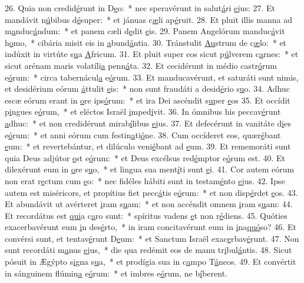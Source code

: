 26. Quia non credid\uline{é}runt in D\uline{e}o:~* nec speravérunt in salut\uline{á}ri \uline{e}jus:
27. Et mandávit n\uline{ú}bibus d\uline{é}super:~* et jánuas c\uline{æ}li ap\uline{é}ruit.
28. Et pluit illis manna ad m\uline{a}nduc\uline{á}ndum:~* et panem cæli d\uline{e}dit \uline{e}is.
29. Panem Angelórum manduc\uline{á}vit h\uline{o}mo,~* cibária misit eis in \uline{a}bund\uline{á}ntia.
30. Tránstulit \uline{Au}strum de c\uline{æ}lo:~* et indúxit in virtúte s\uline{u}a \uline{A}fricum.
31. Et pluit super eos sicut p\uline{ú}lverem c\uline{a}rnes:~* et sicut arénam maris volatíli\uline{a} penn\uline{á}ta.
32. Et cecidérunt in médio castr\uline{ó}rum e\uline{ó}rum:~* circa tabernácul\uline{a} e\uline{ó}rum.
33. Et manducavérunt, et saturáti sunt nimis, et desidérium eórum \uline{á}ttulit \uline{e}is:~* non sunt fraudáti a desid\uline{é}rio s\uline{u}o.
34. Adhuc escæ eórum erant in \uline{o}re ips\uline{ó}rum:~* et ira Dei ascéndit s\uline{u}per \uline{e}os
35. Et occídit p\uline{i}ngues e\uline{ó}rum,~* et eléctos Israël \uline{i}mped\uline{í}vit.
36. In ómnibus his peccav\uline{é}runt \uline{a}dhuc:~* et non credidérunt mirab\uline{í}libus \uline{e}jus.
37. Et defecérunt in vanitáte d\uline{i}es e\uline{ó}rum:~* et anni eórum cum festin\uline{a}ti\uline{ó}ne.
38. Cum occíderet eos, quær\uline{é}bant \uline{e}um:~* et revertebántur, et dilúculo veni\uline{é}bant ad \uline{e}um.
39. Et rememoráti sunt quia Deus adjútor \uline{e}st e\uline{ó}rum:~* et Deus excélsus red\uline{é}mptor e\uline{ó}rum est.
40. Et dilexérunt eum in \uline{o}re s\uline{u}o,~* et lingua sua ment\uline{í}ti sunt \uline{e}i.
41. Cor autem eórum non erat r\uline{e}ctum cum \uline{e}o:~* nec fidéles hábiti sunt in testam\uline{é}nto \uline{e}jus.
42. Ipse autem est miséricors, et propítius fiet pecc\uline{á}tis e\uline{ó}rum:~* et non disp\uline{é}rdet \uline{e}os.
43. Et abundávit ut avérteret \uline{i}ram s\uline{u}am:~* et non accéndit omnem \uline{i}ram s\uline{u}am:
44. Et recordátus est \uline{qui}a c\uline{a}ro sunt:~* spíritus vadens \uline{e}t non r\uline{é}diens.
45. Quóties exacerbavérunt eum \uline{i}n des\uline{é}rto,~* in iram concitavérunt eum in \uline{i}na\uline{quó}so?
46. Et convérsi sunt, et tentav\uline{é}runt D\uline{e}um:~* et Sanctum Israël exac\uline{e}rbav\uline{é}runt.
47. Non sunt recordáti m\uline{a}nus \uline{e}jus,~* die qua redémit eos de manu tr\uline{i}bul\uline{á}ntis.
48. Sicut pósuit in Ægýpto s\uline{i}gna s\uline{u}a,~* et prodígia sua in c\uline{a}mpo T\uline{á}neos.
49. Et convértit in sánguinem flúmin\uline{a} e\uline{ó}rum:~* et imbres e\uline{ó}rum, ne b\uline{í}berent.
